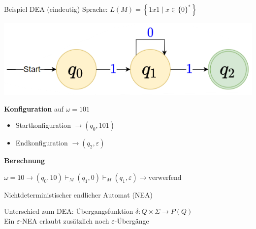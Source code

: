 \begin{example2}{Beispiel DEA (eindeutig)} Sprache: $L(M)=\left\{1 x 1 \mid x \in\{0\}^{*}\right\}$
    
    \begin{minipage}{0.45\linewidth}
        \includegraphics[width=1\linewidth]{images/dea_example.png}
    \end{minipage}
    \hspace{1mm}
    \begin{minipage}{0.5\linewidth}
        \textbf{Konfiguration} auf $\omega=101$
        \begin{itemize}
        \item Startkonfiguration $\rightarrow\left(q_{0}, 101\right)$
        \item Endkonfiguration $\rightarrow\left(q_{2}, \varepsilon\right)$
        \end{itemize}
    \end{minipage}

    \textbf{Berechnung}


    
    $\omega=10 \rightarrow\left(q_{0}, 10\right) \vdash_{M}\left(q_{1}, 0\right) \vdash_{M}\left(q_{1}, \varepsilon\right) \rightarrow \text{verwerfend}$
    
\end{example2}


\begin{definition}{Nichtdeterministischer endlicher Automat (NEA)}
    
        Unterschied zum DEA: Übergangsfunktion $\delta: Q \times \Sigma \rightarrow P(Q)$\\
        Ein $\varepsilon$-NEA erlaubt zusätzlich noch $\varepsilon$-Übergänge
\end{definition}




